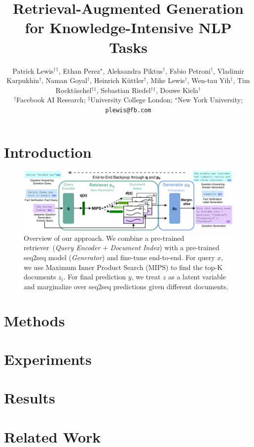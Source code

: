 \documentclass{article}
\title{Retrieval-Augmented Generation for Knowledge-Intensive NLP Tasks}
\author{%
  Patrick Lewis${}^\dagger{}^\ddagger$, Ethan Perez$^\star$,\And
  Aleksandra Piktus$^\dagger$, Fabio Petroni$^\dagger$, Vladimir Karpukhin$^\dagger$, Naman Goyal$^\dagger$, Heinrich K\"uttler$^\dagger$,\And
  Mike Lewis$^\dagger$, Wen-tau Yih$^\dagger$, Tim Rockt\"aschel${}^\dagger{}^\ddagger$, Sebastian Riedel${}^\dagger{}^\ddagger$, Douwe Kiela$^\dagger$\vspace{15pt}\\
  $^\dagger$Facebook AI Research; $^\ddagger$University College London; $^\star$New York University;\vspace{2pt}\\
  \texttt{plewis@fb.com}\\
}
\begin{document}
\maketitle

\begin{abstract}

\end{abstract}

\section{Introduction}


\begin{figure}[t]
\centering
\includegraphics[width=\textwidth]{images/RAG-Architecture.pdf}
\caption{Overview of our approach. We combine a pre-trained retriever~(\emph{Query Encoder} + \emph{Document Index}) with a pre-trained seq2seq model (\emph{Generator}) and fine-tune end-to-end. For  query $x$, we use Maximum Inner Product Search (MIPS) to find the top-K documents $z_i$. For final prediction $y$, we treat $z$ as a latent variable and marginalize over seq2seq predictions given different documents.}
\label{fig:fig_1}
\end{figure}

\section{Methods}


\section{Experiments}


\section{Results}


\section{Related Work}

\end{document}
